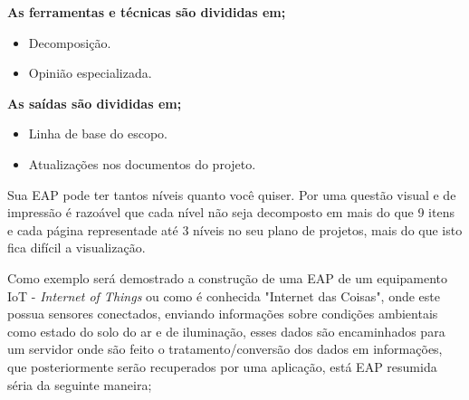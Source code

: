 \documentclass[12pt]{article}
\begin{document}
\textbf{As ferramentas e técnicas são divididas em;}
	\begin{itemize}

		\item
		Decomposição.
		
		\item
		Opinião especializada.
		
		\end{itemize}


\textbf{As saídas são divididas em;}
	\begin{itemize}

		\item
		Linha de base do escopo.
		
		\item
Atualizações nos documentos do projeto.

	\end{itemize}

Sua EAP pode ter tantos níveis quanto você quiser. Por uma questão visual e de impressão é razoável que cada nível não seja decomposto em mais do que 9 itens e cada página representade até 3 níveis no seu plano de projetos, mais do que isto fica difícil a visualização.

Como exemplo será demostrado a construção de uma EAP de um equipamento IoT - \textit{Internet of Things} ou como é conhecida "Internet das Coisas", onde este possua sensores conectados, enviando informações sobre condições ambientais como estado do solo do ar e de iluminação, esses dados são encaminhados para um servidor onde são feito o tratamento/conversão dos dados em informações, que posteriormente serão recuperados por uma aplicação, está EAP resumida séria da seguinte maneira;
\end{document}
